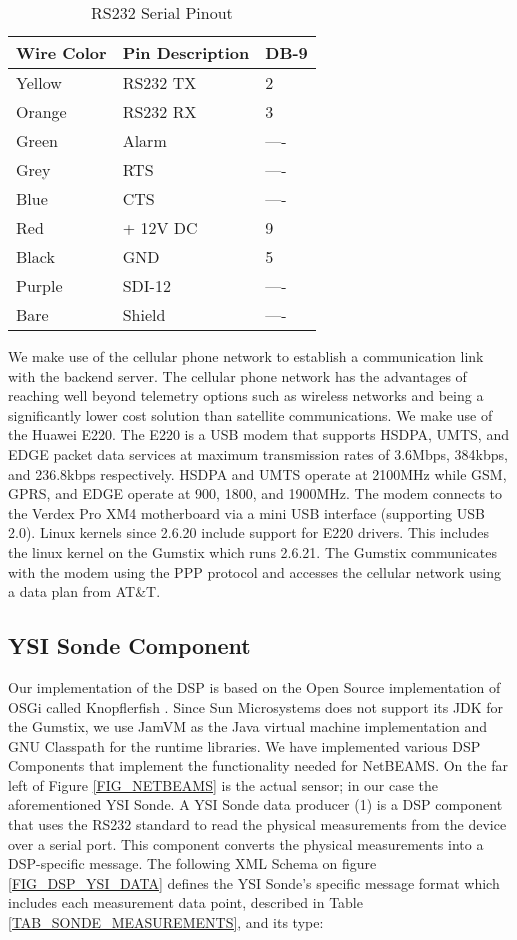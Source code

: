 \documentclass[conference]{IEEEtran}
\begin{document}
\begin{table}
\caption{\label{TAB_RS232_Pinout}RS232 Serial Pinout}
\centering
\begin{tabular} {|l|l|l|}
\hline
Wire Color	&Pin Description        &DB-9\\ 
\hline
Yellow 		&RS232 TX    &2\\
Orange		&RS232 RX    &3\\  
Green  		&Alarm       &----\\ 
Grey			&RTS         &----\\
Blue  		&CTS         &----\\
Red			&+ 12V DC    &9\\
Black			&GND         &5\\  
Purple		&SDI-12      &----\\ 
Bare			&Shield      &----\\
\hline
\end{tabular}
\end{table}
 

We make use of the cellular phone network to establish a communication
link with the backend server. The cellular phone network has the
advantages of reaching well beyond telemetry options such as wireless
networks and being a significantly lower cost solution than satellite
communications. We make use of the Huawei E220. The E220 is a USB
modem that supports HSDPA, UMTS, and EDGE packet data services at maximum
transmission rates of 3.6Mbps, 384kbps, and 236.8kbps respectively.
HSDPA and UMTS operate at 2100MHz while GSM, GPRS, and EDGE operate at
900, 1800, and 1900MHz. The modem connects to the Verdex Pro XM4
motherboard via a mini USB interface (supporting USB 2.0). Linux
kernels since 2.6.20 include support for E220 drivers.  This includes
the linux kernel on the Gumstix which runs 2.6.21.  The Gumstix
communicates with the modem using the PPP protocol and accesses the
cellular network using a data plan from AT\&T.



\subsection{YSI Sonde Component}

Our implementation of the DSP is based on the Open Source
implementation of OSGi called Knopflerfish \cite{knopflerfish01}. Since Sun
Microsystems does not support its JDK for the Gumstix, we use JamVM
\cite{jamvm01} as the Java virtual machine implementation and GNU Classpath
\cite{classpath01} for the runtime libraries. We have implemented various DSP
Components that implement the functionality needed for NetBEAMS. On
the far left of Figure \ref{FIG_NETBEAMS} is the actual sensor; in our
case the aforementioned YSI Sonde. A YSI Sonde data producer (1) is a DSP
component that uses the RS232 standard to read the physical measurements from
the device over a serial port. This component converts the physical measurements 
into a DSP-specific message. The following XML Schema on figure \ref{FIG_DSP_YSI_DATA} 
defines the YSI Sonde's specific message format which includes each measurement data point, described in
Table \ref{TAB_SONDE_MEASUREMENTS}, and its type:
\end{document}
